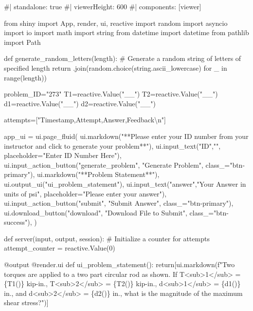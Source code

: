 \documentclass[
  letterpaper,
  DIV=11,
  numbers=noendperiod]{scrreprt}
\newenvironment{Shaded}{\begin{snugshade}}{\end{snugshade}}
\newcommand{\NormalTok}[1]{\textcolor[rgb]{0.00,0.23,0.31}{#1}}
\begin{document}
\begin{Shaded}
\begin{Highlighting}[]
\NormalTok{\#| standalone: true}
\NormalTok{\#| viewerHeight: 600}
\NormalTok{\#| components: [viewer]}

\NormalTok{from shiny import App, render, ui, reactive}
\NormalTok{import random}
\NormalTok{import asyncio}
\NormalTok{import io}
\NormalTok{import math}
\NormalTok{import string}
\NormalTok{from datetime import datetime}
\NormalTok{from pathlib import Path}

\NormalTok{def generate\_random\_letters(length):}
\NormalTok{    \# Generate a random string of letters of specified length}
\NormalTok{    return \textquotesingle{}\textquotesingle{}.join(random.choice(string.ascii\_lowercase) for \_ in range(length)) }

\NormalTok{problem\_ID="273"}
\NormalTok{T1=reactive.Value("\_\_")}
\NormalTok{T2=reactive.Value("\_\_")}
\NormalTok{d1=reactive.Value("\_\_")}
\NormalTok{d2=reactive.Value("\_\_")}

\NormalTok{attempts=["Timestamp,Attempt,Answer,Feedback\textbackslash{}n"]}

\NormalTok{app\_ui = ui.page\_fluid(}
\NormalTok{    ui.markdown("**Please enter your ID number from your instructor and click to generate your problem**"),}
\NormalTok{    ui.input\_text("ID","", placeholder="Enter ID Number Here"),}
\NormalTok{    ui.input\_action\_button("generate\_problem", "Generate Problem", class\_="btn{-}primary"),}
\NormalTok{    ui.markdown("**Problem Statement**"),}
\NormalTok{    ui.output\_ui("ui\_problem\_statement"),}
\NormalTok{    ui.input\_text("answer","Your Answer in units of psi", placeholder="Please enter your answer"),}
\NormalTok{    ui.input\_action\_button("submit", "Submit Answer", class\_="btn{-}primary"),}
\NormalTok{    ui.download\_button("download", "Download File to Submit", class\_="btn{-}success"),}
\NormalTok{)}


\NormalTok{def server(input, output, session):}
\NormalTok{    \# Initialize a counter for attempts}
\NormalTok{    attempt\_counter = reactive.Value(0)}

\NormalTok{    @output}
\NormalTok{    @render.ui}
\NormalTok{    def ui\_problem\_statement():}
\NormalTok{        return[ui.markdown(f"Two torques are applied to a two part circular rod as shown. If T\textless{}sub\textgreater{}1\textless{}/sub\textgreater{} = \{T1()\} kip{-}in., T\textless{}sub\textgreater{}2\textless{}/sub\textgreater{} = \{T2()\} kip{-}in., d\textless{}sub\textgreater{}1\textless{}/sub\textgreater{} = \{d1()\} in., and d\textless{}sub\textgreater{}2\textless{}/sub\textgreater{} = \{d2()\} in., what is the magnitude of the maximum shear stress?")]}
    

\end{Highlighting}
\end{Shaded}
\end{document}
